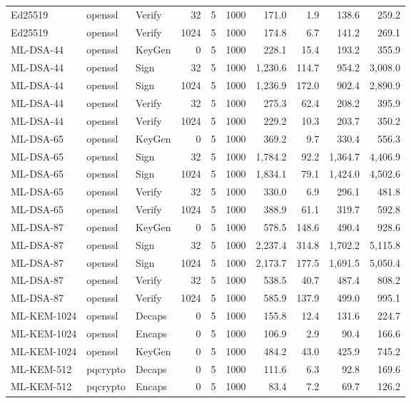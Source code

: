 \begin{table}[ht]
\begin{tabular}{@{}lllrrrrrrr@{}}
Ed25519 & openssl & Verify & 32 & 5 & 1000 & 171.0 & 1.9 & 138.6 & 259.2 \\
Ed25519 & openssl & Verify & 1024 & 5 & 1000 & 174.8 & 6.7 & 141.2 & 269.1 \\
ML-DSA-44 & openssl & KeyGen & 0 & 5 & 1000 & 228.1 & 15.4 & 193.2 & 355.9 \\
ML-DSA-44 & openssl & Sign & 32 & 5 & 1000 & 1,230.6 & 114.7 & 954.2 & 3,008.0 \\
ML-DSA-44 & openssl & Sign & 1024 & 5 & 1000 & 1,236.9 & 172.0 & 902.4 & 2,890.9 \\
ML-DSA-44 & openssl & Verify & 32 & 5 & 1000 & 275.3 & 62.4 & 208.2 & 395.9 \\
ML-DSA-44 & openssl & Verify & 1024 & 5 & 1000 & 229.2 & 10.3 & 203.7 & 350.2 \\
ML-DSA-65 & openssl & KeyGen & 0 & 5 & 1000 & 369.2 & 9.7 & 330.4 & 556.3 \\
ML-DSA-65 & openssl & Sign & 32 & 5 & 1000 & 1,784.2 & 92.2 & 1,364.7 & 4,406.9 \\
ML-DSA-65 & openssl & Sign & 1024 & 5 & 1000 & 1,834.1 & 79.1 & 1,424.0 & 4,502.6 \\
ML-DSA-65 & openssl & Verify & 32 & 5 & 1000 & 330.0 & 6.9 & 296.1 & 481.8 \\
ML-DSA-65 & openssl & Verify & 1024 & 5 & 1000 & 388.9 & 61.1 & 319.7 & 592.8 \\
ML-DSA-87 & openssl & KeyGen & 0 & 5 & 1000 & 578.5 & 148.6 & 490.4 & 928.6 \\
ML-DSA-87 & openssl & Sign & 32 & 5 & 1000 & 2,237.4 & 314.8 & 1,702.2 & 5,115.8 \\
ML-DSA-87 & openssl & Sign & 1024 & 5 & 1000 & 2,173.7 & 177.5 & 1,691.5 & 5,050.4 \\
ML-DSA-87 & openssl & Verify & 32 & 5 & 1000 & 538.5 & 40.7 & 487.4 & 808.2 \\
ML-DSA-87 & openssl & Verify & 1024 & 5 & 1000 & 585.9 & 137.9 & 499.0 & 995.1 \\
ML-KEM-1024 & openssl & Decaps & 0 & 5 & 1000 & 155.8 & 12.4 & 131.6 & 224.7 \\
ML-KEM-1024 & openssl & Encaps & 0 & 5 & 1000 & 106.9 & 2.9 & 90.4 & 166.6 \\
ML-KEM-1024 & openssl & KeyGen & 0 & 5 & 1000 & 484.2 & 43.0 & 425.9 & 745.2 \\
ML-KEM-512 & pqcrypto & Decaps & 0 & 5 & 1000 & 111.6 & 6.3 & 92.8 & 169.6 \\
ML-KEM-512 & pqcrypto & Encaps & 0 & 5 & 1000 & 83.4 & 7.2 & 69.7 & 126.2 \\

\end{tabular}
\end{table}
